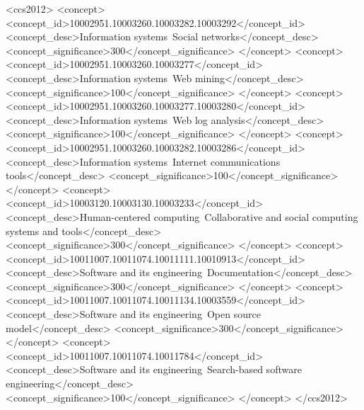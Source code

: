 \documentclass{sig-alternate-05-2015}
\begin{document}
%
%

\begin{CCSXML}
<ccs2012>
<concept>
<concept_id>10002951.10003260.10003282.10003292</concept_id>
<concept_desc>Information systems~Social networks</concept_desc>
<concept_significance>300</concept_significance>
</concept>
<concept>
<concept_id>10002951.10003260.10003277</concept_id>
<concept_desc>Information systems~Web mining</concept_desc>
<concept_significance>100</concept_significance>
</concept>
<concept>
<concept_id>10002951.10003260.10003277.10003280</concept_id>
<concept_desc>Information systems~Web log analysis</concept_desc>
<concept_significance>100</concept_significance>
</concept>
<concept>
<concept_id>10002951.10003260.10003282.10003286</concept_id>
<concept_desc>Information systems~Internet communications tools</concept_desc>
<concept_significance>100</concept_significance>
</concept>
<concept>
<concept_id>10003120.10003130.10003233</concept_id>
<concept_desc>Human-centered computing~Collaborative and social computing systems and tools</concept_desc>
<concept_significance>300</concept_significance>
</concept>
<concept>
<concept_id>10011007.10011074.10011111.10010913</concept_id>
<concept_desc>Software and its engineering~Documentation</concept_desc>
<concept_significance>300</concept_significance>
</concept>
<concept>
<concept_id>10011007.10011074.10011134.10003559</concept_id>
<concept_desc>Software and its engineering~Open source model</concept_desc>
<concept_significance>300</concept_significance>
</concept>
<concept>
<concept_id>10011007.10011074.10011784</concept_id>
<concept_desc>Software and its engineering~Search-based software engineering</concept_desc>
<concept_significance>100</concept_significance>
</concept>
</ccs2012>
\end{CCSXML}

\end{document}

